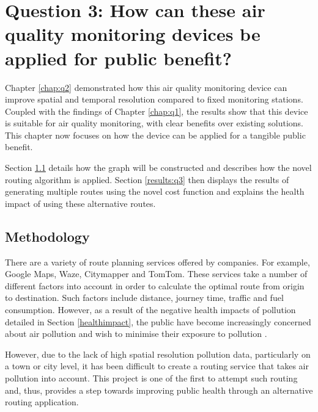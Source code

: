 \documentclass[11pt,twosided,a4paper]{report}
\begin{document}

\chapter[Public benefit application]{Question 3: How can these air quality monitoring devices be applied for public benefit?} \label{chap:q3}

Chapter \ref{chap:q2} demonstrated how this air quality monitoring device can improve spatial and temporal resolution compared to fixed monitoring stations. Coupled with the findings of Chapter \ref{chap:q1}, the results show that this device is suitable for air quality monitoring, with clear benefits over existing solutions. This chapter now focuses on how the device can be applied for a tangible public benefit.

Section \ref{meth:q3} details how the graph will be constructed and describes how the novel routing algorithm is applied. Section \ref{results:q3} then displays the results of generating multiple routes using the novel cost function and explains the health impact of using these alternative routes.

\section{Methodology} \label{meth:q3}

There are a variety of route planning services offered by companies. For example, Google Maps, Waze, Citymapper and TomTom. These services take a number of different factors into account in order to calculate the optimal route from origin to destination. Such factors include distance, journey time, traffic and fuel consumption. However, as a result of the negative health impacts of pollution detailed in Section \ref{healthimpact}, the public have become increasingly concerned about air pollution and wish to minimise their exposure to pollution \citep{hartog2010health}.

However, due to the lack of high spatial resolution pollution data, particularly on a town or city level, it has been difficult to create a routing service that takes air pollution into account. This project is one of the first to attempt such routing \citep{sharker2014exposureroutes, Hasenfratz2015highresmapsTram} and, thus, provides a step towards improving public health through an alternative routing application.
\end{document}
